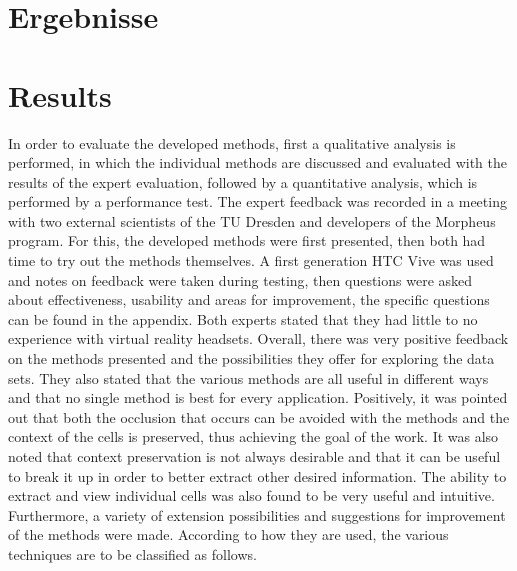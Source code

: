 {\chapter{Ergebnisse}}
{\chapter{Results}}

\label{sec:results}



In order to evaluate the developed methods, first a qualitative analysis is performed, in which the individual methods are discussed and evaluated with the results of the expert evaluation, followed by a quantitative analysis, which is performed by a performance test.
The expert feedback was recorded in a meeting with two external scientists of the TU Dresden and developers of the Morpheus program. For this, the developed methods were first presented, then both had time to try out the methods themselves. A first generation HTC Vive was used and notes on feedback were taken during testing, then questions were asked about effectiveness, usability and areas for improvement, the specific questions can be found in the appendix. Both experts stated that they had little to no experience with virtual reality headsets.
Overall, there was very positive feedback on the methods presented and the possibilities they offer for exploring the data sets.
They also stated that the various methods are all useful in different ways and that no single method is best for every application.
Positively, it was pointed out that both the occlusion that occurs can be avoided with the methods and the context of the cells is preserved, thus achieving the goal of the work.
It was also noted that context preservation is not always desirable and that it can be useful to break it up in order to better extract other desired information.
The ability to extract and view individual cells was also found to be very useful and intuitive.
Furthermore, a variety of extension possibilities and suggestions for improvement of the methods were made.
According to how they are used, the various techniques are to be classified as follows.


